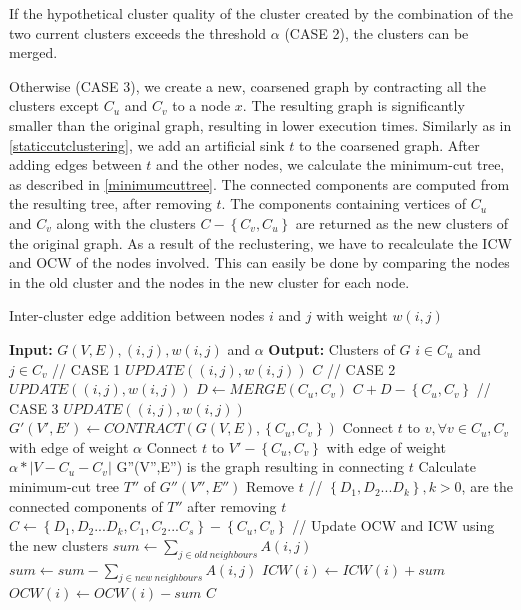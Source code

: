 If the hypothetical cluster quality of the cluster created by the combination of the two current clusters exceeds the threshold $\alpha$ (CASE 2), the clusters can be merged. 

Otherwise (CASE 3), we create a new, coarsened graph by contracting all the clusters except $C_u$ and $C_v$ to a node $x$. The resulting graph is significantly smaller than the original graph, resulting in lower execution times. Similarly as in \autoref{staticcutclustering}, we add an artificial sink $t$ to the coarsened graph. After adding edges between $t$ and the other nodes, we calculate the minimum-cut tree, as described in \autoref{minimumcuttree}. The connected components are computed from the resulting tree, after removing $t$. The components containing vertices of $C_u$ and $C_v$ along with the clusters $C-\left\{C_v,C_u\right\}$ are returned as the new clusters of the original graph. As a result of the reclustering, we have to recalculate the ICW and OCW of the nodes involved. This can easily be done by comparing the nodes in the old cluster and the nodes in the new cluster for each node.

\begin{algorithm}
\caption{Inter-cluster edge addition between nodes $i$ and $j$ with weight $w(i,j)$}
\label{intercluster}
\begin{algorithmic}
\STATE \textbf{Input:} $G(V,E), (i,j), w(i,j)$ and $\alpha$ 
\STATE \textbf{Output:} Clusters of $G$
\STATE $i \in C_u$ and $j \in C_v$
	\STATE // CASE 1
	\STATE $UPDATE((i,j),w(i,j))$
	\RETURN $C$
	\STATE // CASE 2
	\STATE $UPDATE((i,j),w(i,j))$
	\STATE $D \leftarrow MERGE(C_u,C_v)$
	\RETURN $C + D - \left\{C_u,C_v\right\}$
\ELSE
	\STATE // CASE 3
	\STATE $UPDATE((i,j),w(i,j))$
	\STATE $G'(V',E') \leftarrow CONTRACT(G(V,E),\left\{C_u,C_v\right\} )$
	\STATE Connect $t$ to $v, \forall v \in C_u,C_v$ with edge of weight $\alpha$
	\STATE Connect $t$ to $V' - \left\{C_u, C_v\right\}$ with edge of weight $\alpha * \left| V - C_u - C_v \right|$
	\STATE G''(V'',E'') is the graph resulting in connecting $t$
	\STATE Calculate minimum-cut tree $T''$ of $G''(V'',E'')$
	\STATE Remove $t$
	\STATE // $\left\{D_1,D_2...D_k\right\}, k > 0$, are the connected components of $T''$ after removing $t$
	\STATE $C \leftarrow \left\{D_1,D_2...D_k,C_1,C_2...C_s\right\} - \left\{ C_u,C_v \right\}$
	\STATE // Update OCW and ICW using the new clusters
		\STATE $sum \leftarrow \sum_{j \in old~neighbours}{A(i,j)}$
		\STATE $sum \leftarrow sum - \sum_{j \in new~neighbours}{A(i,j)}$
		\STATE $ICW(i) \leftarrow ICW(i) + sum$
		\STATE $OCW(i) \leftarrow OCW(i) - sum$
	\ENDFOR
	\RETURN $C$
\ENDIF
\end{algorithmic}
\end{algorithm}

